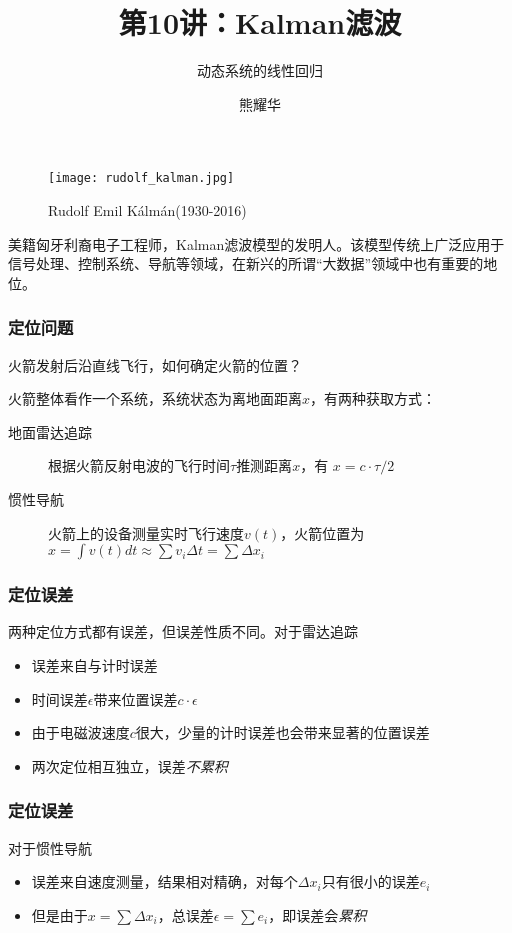 \documentclass[14pt]{beamer}
\title{第10讲：Kalman滤波}
\subtitle{动态系统的线性回归}
\author{熊耀华}
\institute{交通工程系}
\begin{document}
\begin{frame}
    \titlepage
\end{frame}

\begin{frame}
  \begin{figure}
    \centering
    \texttt{[image: rudolf\_kalman.jpg]}
    \caption{Rudolf Emil K\'alm\'an(1930-2016)}
  \end{figure}

  \small 美籍匈牙利裔电子工程师，Kalman滤波模型的发明人。该模型传统上广泛应用于
  信号处理、控制系统、导航等领域，在新兴的所谓“大数据”领域中也有重要的地位。
\end{frame}

\begin{frame}
  \frametitle{定位问题}
  火箭发射后沿直线飞行，如何确定火箭的位置？

  {\small 火箭整体看作一个系统，系统状态为离地面距离$x$，有两种获取方式：}
  \begin{description}
    \item[地面雷达追踪] 根据火箭反射电波的飞行时间$\tau$推测距离$x$，有
    $x=c\cdot \tau/2$  
    \item[惯性导航] 火箭上的设备测量实时飞行速度$v(t)$，火箭位置为
    $x=\int v(t)dt\approx\sum v_i\Delta t=\sum \Delta x_i$
  \end{description}
\end{frame}

\begin{frame}
  \frametitle{定位误差}
  两种定位方式都有误差，但误差性质不同。对于雷达追踪
  \begin{itemize}
    \item 误差来自与计时误差
    \item 时间误差$\epsilon$带来位置误差$c\cdot\epsilon$
    \item 由于电磁波速度$c$很大，少量的计时误差也会带来显著的位置误差
    \item 两次定位相互独立，误差\emph{不累积}
  \end{itemize}
\end{frame}

\begin{frame}
  \frametitle{定位误差}
  对于惯性导航
  \begin{itemize}
    \item 误差来自速度测量，结果相对精确，对每个$\Delta x_i$只有很小的误差$e_i$
    \item 但是由于$x=\sum \Delta x_i$，总误差$\epsilon=\sum e_i$，即误差会\emph{累积}
  \end{itemize}
\end{frame}
\end{document}
